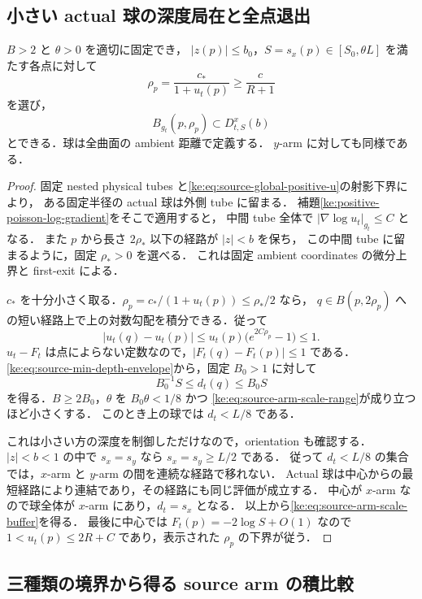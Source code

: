 \subsection{小さい actual 球の深度局在と全点退出}

\begin{lemma}
\label{ke:source-arm-scale-buffer}
$B>2$ と $\theta>0$ を適切に固定でき，
$|z(p)|\le b_0$，$S=s_x(p)\in[S_0,\theta L]$ を満たす各点に対して
\[
 \rho_p=\frac{c_*}{1+u_t(p)}\ge\frac{c}{R+1}
\]
を選び，
\begin{equation}\label{ke:eq:source-arm-scale-buffer}
 B_{g_t}(p,\rho_p)\subset D^x_{t,S}(b)
\end{equation}
とできる．球は全曲面の ambient 距離で定義する．
$y$-arm に対しても同様である．
\end{lemma}

\begin{proof}
固定 nested physical tubes と\eqref{ke:eq:source-global-positive-u}の射影下界により，
ある固定半径の actual 球は外側 tube に留まる．
補題\ref{ke:positive-poisson-log-gradient}をそこで適用すると，
中間 tube 全体で $|\nabla\log u_t|_{g_t}\le C$ となる．
また $p$ から長さ $2\rho_*$ 以下の経路が $|z|<b$ を保ち，
この中間 tube に留まるように，固定 $\rho_*>0$ を選べる．
これは固定 ambient coordinates の微分上界と first-exit による．

$c_*$ を十分小さく取る．$\rho_p=c_* /(1+u_t(p))\le\rho_*/2$ なら，
$q\in B(p,2\rho_p)$ への短い経路上で上の対数勾配を積分できる．従って
\[
 |u_t(q)-u_t(p)|
 \le u_t(p)\bigl(e^{2C\rho_p}-1\bigr)\le1.
\]
$u_t-F_t$ は点によらない定数なので，$|F_t(q)-F_t(p)|\le1$ である．
\eqref{ke:eq:source-min-depth-envelope}から，固定 $B_0>1$ に対して
\[
 B_0^{-1}S\le d_t(q)\le B_0S
\]
を得る．$B\ge2B_0$，$\theta$ を $B_0\theta<1/8$ かつ
\eqref{ke:eq:source-arm-scale-range}が成り立つほど小さくする．
このとき上の球では $d_t<L/8$ である．

これは小さい方の深度を制御しただけなので，orientation も確認する．
$|z|<b<1$ の中で $s_x=s_y$ なら $s_x=s_y\ge L/2$ である．
従って $d_t<L/8$ の集合では，$x$-arm と $y$-arm の間を連続な経路で移れない．
Actual 球は中心からの最短経路により連結であり，その経路にも同じ評価が成立する．
中心が $x$-arm なので球全体が $x$-arm にあり，$d_t=s_x$ となる．
以上から\eqref{ke:eq:source-arm-scale-buffer}を得る．
最後に中心では $F_t(p)=-2\log S+O(1)$ なので
$1<u_t(p)\le2R+C$ であり，表示された $\rho_p$ の下界が従う．
\end{proof}

\subsection{三種類の境界から得る source arm の積比較}


